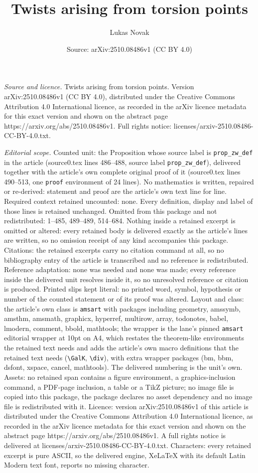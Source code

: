 \documentclass[10pt,a4paper]{amsart}
\title[Twists arising from torsion points]{Twists arising from torsion points}
\author{Lukas Novak}
\date{Source: arXiv:2510.08486v1 (CC BY 4.0)}
\begin{document}
\maketitle

\noindent\emph{Source and licence.} Twists arising from torsion points. Version arXiv:2510.08486v1 (CC BY 4.0), distributed under the Creative Commons Attribution 4.0 International licence, as recorded in the arXiv licence metadata for this exact version and shown on the abstract page https://arxiv.org/abs/2510.08486v1. Full rights notice: licenses/arxiv-2510.08486-CC-BY-4.0.txt.\par\smallskip

\noindent\textit{Editorial scope.} Counted unit: the Proposition whose source label is \texttt{prop\_zw\_def} in the article (source0.tex lines 486--488, source label \texttt{prop\_zw\_def}), delivered together with the article's own complete original proof of it (source0.tex lines 490--513, one \texttt{proof} environment of 24 lines). No mathematics is written, repaired or re-derived: statement and proof are the article's own text line for line. Required context retained uncounted: none. Every definition, display and label of those lines is retained unchanged. Omitted from this package and not redistributed: 1--485, 489--489, 514--684. Nothing inside a retained excerpt is omitted or altered: every retained body is delivered exactly as the article's lines are written, so no omission receipt of any kind accompanies this package. Citations: the retained excerpts carry no citation command at all, so no bibliography entry of the article is transcribed and no reference is redistributed. Reference adaptation: none was needed and none was made; every reference inside the delivered unit resolves inside it, so no unresolved reference or citation is produced. Printed slips kept literal: no printed word, symbol, hypothesis or number of the counted statement or of its proof was altered. Layout and class: the article's own class is \texttt{amsart} with packages including geometry, amssymb, amsthm, amsmath, graphicx, hyperref, multirow, array, todonotes, babel, lmodern, comment, bbold, mathtools; the wrapper is the lane's pinned \texttt{amsart} editorial wrapper at 10pt on A4, which restates the theorem-like environments the retained text needs and adds the article's own macro definitions that the retained text needs (\texttt{\textbackslash GalK}, \texttt{\textbackslash div}), with extra wrapper packages (bm, bbm, dsfont, xspace, cancel, mathtools). The delivered numbering is the unit's own. Assets: no retained span contains a figure environment, a graphics-inclusion command, a PDF-page inclusion, a table or a TikZ picture; no image file is copied into this package, the package declares no asset dependency and no image file is redistributed with it. Licence: version arXiv:2510.08486v1 of this article is distributed under the Creative Commons Attribution 4.0 International licence, as recorded in the arXiv licence metadata for this exact version and shown on the abstract page https://arxiv.org/abs/2510.08486v1. A full rights notice is delivered at licenses/arxiv-2510.08486-CC-BY-4.0.txt. Characters: every retained excerpt is pure ASCII, so the delivered engine, XeLaTeX with its default Latin Modern text font, reports no missing character.
\end{document}
